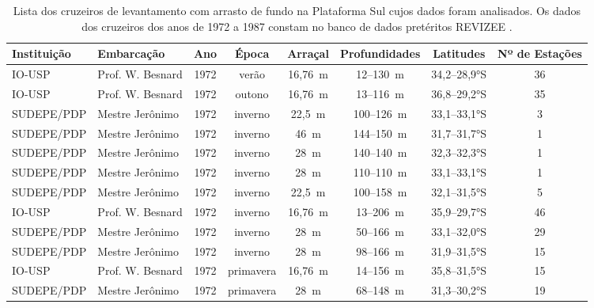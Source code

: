 \documentclass[a4paper,11pt,twoside,showtrims,onecolumn,openright,final]{memoir}
\begin{document}
\begin{table}
\caption[Lista dos cruzeiros de levantamento com arrasto de fundo na Plataforma Sul]
        {Lista dos cruzeiros de levantamento com arrasto de fundo na Plataforma Sul
         cujos dados foram analisados. Os dados dos cruzeiros dos anos 
         de 1972 a 1987 constam no banco de dados pretéritos REVIZEE \citep{klippel2000c}.}
\label{tab:cruz-dados-preteritos}	 
\begin{tiny}
\begin{tabular*}{\textwidth}{l@{\extracolsep{\fill}}lcccccc}
\toprule
Instituição	&       Embarcação	 & Ano	& Época		& Arraçal	& Profundidades & Latitudes	& Nº de Estações	\\
\midrule
 IO-USP		&	Prof. W. Besnard & 1972 &         verão &   16,76~m &      12--130~m &   34,2--28,9°S &          36 	\\
 IO-USP		&	Prof. W. Besnard & 1972 &         outono &   16,76~m &      13--116~m &   36,8--29,2°S &          35 	\\
 SUDEPE/PDP	&	Mestre Jerônimo  & 1972 &         inverno &    22,5~m &     100--126~m &   33,1--33,1°S &           3 	\\
 SUDEPE/PDP	&	Mestre Jerônimo  & 1972 &         inverno &      46~m &     144--150~m &   31,7--31,7°S &           1 	\\
 SUDEPE/PDP	&	Mestre Jerônimo  & 1972 &         inverno &      28~m &     140--140~m &   32,3--32,3°S &           1 	\\
 SUDEPE/PDP	&	Mestre Jerônimo  & 1972 &         inverno &      28~m &     110--110~m &   33,1--33,1°S &           1 	\\
 SUDEPE/PDP	&	Mestre Jerônimo  & 1972 &         inverno &    22,5~m &     100--158~m &   32,1--31,5°S &           5 	\\
 IO-USP		&	Prof. W. Besnard & 1972 &         inverno &   16,76~m &      13--206~m &   35,9--29,7°S &          46 	\\
 SUDEPE/PDP	&	Mestre Jerônimo  & 1972 &         inverno &      28~m &      50--166~m &   33,1--32,0°S &          29 	\\
 SUDEPE/PDP	&	Mestre Jerônimo  & 1972 &         inverno &      28~m &      98--166~m &   31,9--31,5°S &          15 	\\
 IO-USP		&	Prof. W. Besnard & 1972 &         primavera &   16,76~m &      14--156~m &   35,8--31,5°S &          15 	\\
 SUDEPE/PDP	&	Mestre Jerônimo  & 1972 &         primavera &      28~m &      68--148~m &   31,3--30,2°S &          19 	\\

\end{tabular*}
\end{tiny}
\end{table}
\end{document}
